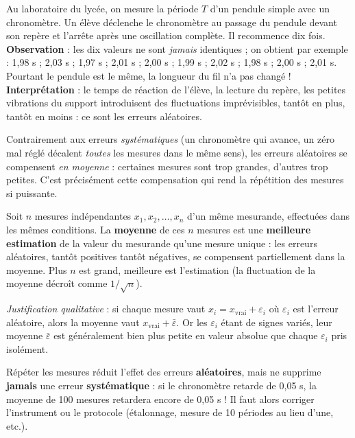 \documentclass[11pt]{article}
\newcommand{\cle}[1]{{\popxbold\color{popdark}#1}}
\newcounter{popsec}
\newcounter{popsub}
\newcommand{\courssub}[1]{%
  \stepcounter{popsub}%
  \par\vspace{9pt}\noindent{\popxbold\fontsize{11.5}{13}\selectfont\color{popink}{\color{poporange}\thepopsec.\thepopsub}\hspace{6pt}#1}\par\nopagebreak\vspace{4pt}
}
\begin{document}
\courssub{Pourquoi répéter une mesure ?}

\begin{experience}
Au laboratoire du lycée, on mesure la période $T$ d'un pendule simple avec un chronomètre. Un élève déclenche le chronomètre au passage du pendule devant son repère et l'arrête après une oscillation complète. Il recommence dix fois. \textbf{Observation} : les dix valeurs ne sont \emph{jamais} identiques ; on obtient par exemple : 1,98 s ; 2,03 s ; 1,97 s ; 2,01 s ; 2,00 s ; 1,99 s ; 2,02 s ; 1,98 s ; 2,00 s ; 2,01 s. Pourtant le pendule est le même, la longueur du fil n'a pas changé ! \textbf{Interprétation} : le temps de réaction de l'élève, la lecture du repère, les petites vibrations du support introduisent des fluctuations imprévisibles, tantôt en plus, tantôt en moins : ce sont les \cle{erreurs aléatoires}.
\end{experience}

Contrairement aux erreurs \emph{systématiques} (un chronomètre qui avance, un zéro mal réglé décalent \emph{toutes} les mesures dans le même sens), les erreurs aléatoires se compensent \emph{en moyenne} : certaines mesures sont trop grandes, d'autres trop petites. C'est précisément cette compensation qui rend la répétition des mesures si puissante.

\begin{propriete}
Soit $n$ mesures indépendantes $x_1, x_2, \ldots, x_n$ d'un même mesurande, effectuées dans les mêmes conditions. La \textbf{moyenne} de ces $n$ mesures est une \textbf{meilleure estimation} de la valeur du mesurande qu'une mesure unique : les erreurs aléatoires, tantôt positives tantôt négatives, se compensent partiellement dans la moyenne. Plus $n$ est grand, meilleure est l'estimation (la fluctuation de la moyenne décroît comme $1/\sqrt{n}$).\par
\emph{Justification qualitative} : si chaque mesure vaut $x_i = x_{\text{vrai}} + \varepsilon_i$ où $\varepsilon_i$ est l'erreur aléatoire, alors la moyenne vaut $x_{\text{vrai}} + \bar{\varepsilon}$. Or les $\varepsilon_i$ étant de signes variés, leur moyenne $\bar{\varepsilon}$ est généralement bien plus petite en valeur absolue que chaque $\varepsilon_i$ pris isolément.
\end{propriete}

\begin{attention}
Répéter les mesures réduit l'effet des erreurs \textbf{aléatoires}, mais ne supprime \textbf{jamais} une erreur \textbf{systématique} : si le chronomètre retarde de 0,05 s, la moyenne de 100 mesures retardera encore de 0,05 s ! Il faut alors corriger l'instrument ou le protocole (étalonnage, mesure de 10 périodes au lieu d'une, etc.).
\end{attention}
\end{document}
